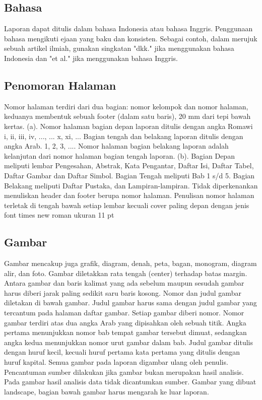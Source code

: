 \subsection{Bahasa}
Laporan dapat ditulis dalam bahasa Indonesia atau bahasa Inggris. Penggunaan bahasa mengikuti ejaan yang baku dan konsisten. Sebagai contoh, dalam merujuk sebuah artikel ilmiah, gunakan singkatan "dkk." jika menggunakan bahasa Indonesia dan "et al." jika menggunakan bahasa Inggris.

\subsection{Penomoran Halaman}
Nomor halaman terdiri dari dua bagian: nomor kelompok dan nomor halaman, keduanya membentuk sebuah footer (dalam satu baris), 20 mm dari tepi bawah kertas. 
(a).	Nomor halaman bagian depan laporan ditulis dengan angka Romawi i, ii, iii, iv, ..., ... x, xi, ... Bagian tengah dan belakang laporan ditulis dengan angka Arab. 1, 2, 3, .... Nomor halaman bagian belakang laporan adalah kelanjutan dari nomor halaman bagian tengah laporan. 
(b).	Bagian Depan meliputi lembar Pengesahan, Abstrak, Kata Pengantar, Daftar Isi, Daftar Tabel, Daftar Gambar dan Daftar Simbol. Bagian Tengah meliputi Bab 1 s/d 5. Bagian Belakang meliputi Daftar Pustaka, dan Lampiran-lampiran. Tidak diperkenankan menuliskan header dan footer berupa nomor halaman. Penulisan nomor halaman terletak di tengah bawah setiap lembar kecuali cover paling depan dengan jenis  font times new roman ukuran 11 pt

\subsection{Gambar}
Gambar mencakup juga grafik, diagram, denah, peta, bagan, monogram, diagram alir, dan foto. Gambar diletakkan rata tengah (center) terhadap batas margin. Antara gambar dan baris kalimat yang ada sebelum maupun sesudah gambar harus diberi jarak paling sedikit saru baris kosong. Nomor dan judul gambar diletakan di bawah gambar. Judul gambar harus sama dengan judul gambar yang tercantum pada halaman daftar gambar. Setiap gambar diberi nomor. Nomor gambar terdiri atas dua angka Arab yang dipisahkan oleh sebuah titik. Angka pertama menunjukkan nomor bab tempat gambar tersebut dimuat, sedangkan angka kedua menunjukkan nomor urut gambar dalam bab. Judul gambar ditulis dengan huruf kecil, kecuali huruf pertama kata pertama yang ditulis dengan huruf kapital. Semua gambar pada laporan digambar ulang oleh penulis. Pencantuman sumber dilakukan jika gambar bukan merupakan hasil analisis. Pada gambar hasil analisis data tidak dicantumkan sumber. Gambar yang dibuat landscape, bagian bawah gambar harus mengarah ke luar laporan.

